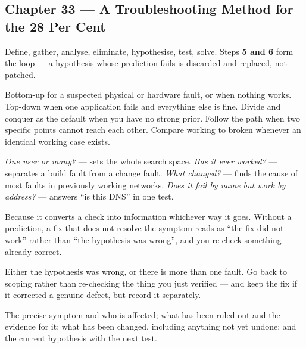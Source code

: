 \subsection*{Chapter 33 --- A Troubleshooting Method for the 28 Per Cent}
\begin{tightnum}
  \item Define, gather, analyse, eliminate, hypothesise, test, solve. Steps
        \textbf{5 and 6} form the loop --- a hypothesis whose prediction fails is
        discarded and replaced, not patched.
  \item Bottom-up for a suspected physical or hardware fault, or when nothing
        works. Top-down when one application fails and everything else is fine.
        Divide and conquer as the default when you have no strong prior. Follow
        the path when two specific points cannot reach each other. Compare working
        to broken whenever an identical working case exists.
  \item \emph{One user or many?} --- sets the whole search space. \emph{Has it ever
        worked?} --- separates a build fault from a change fault. \emph{What
        changed?} --- finds the cause of most faults in previously working
        networks. \emph{Does it fail by name but work by address?} --- answers
        ``is this DNS'' in one test.
  \item Because it converts a check into information whichever way it goes. Without
        a prediction, a fix that does not resolve the symptom reads as ``the fix
        did not work'' rather than ``the hypothesis was wrong'', and you re-check
        something already correct.
  \item Either the hypothesis was wrong, or there is more than one fault. Go back
        to scoping rather than re-checking the thing you just verified --- and
        keep the fix if it corrected a genuine defect, but record it separately.
  \item The precise symptom and who is affected; what has been ruled out and the
        evidence for it; what has been changed, including anything not yet undone;
        and the current hypothesis with the next test.
\end{tightnum}

